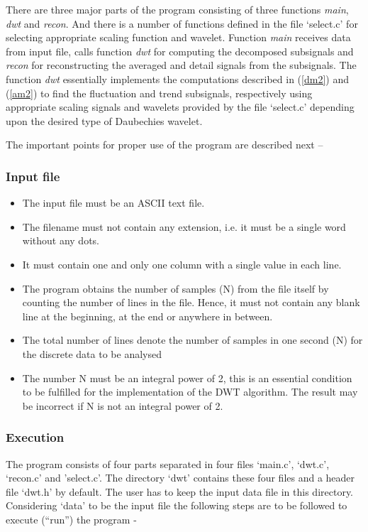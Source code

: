 \documentclass[a4paper,11pt]{report}
\begin{document}
There are three major parts of the program consisting of three functions \emph{main}, \emph{dwt} and \emph{recon}. And there is a number of functions defined in the file `select.c' for selecting appropriate scaling function and wavelet. Function \emph{main} receives data from input file, calls function \emph{dwt} for computing the decomposed subsignals and \emph{recon} for reconstructing the averaged and detail signals from the subsignals. The function \emph{dwt} essentially implements the computations described in (\ref{dm2}) and (\ref{am2}) to find the fluctuation and trend subsignals, respectively using appropriate scaling signals and wavelets provided by the file `select.c' depending upon the desired type of Daubechies wavelet.

The important points for proper use of the program are described next --


\subsubsection{Input file} \label{fftreq}
\begin{itemize}
\item The input file must be an ASCII text file.
\item The filename must not contain any extension, i.e. it must be a single word without any dots.
\item It must contain one and only one column with a single value in each line.
\item The program obtains the number of samples (N) from the file itself by counting the number of lines in the file. Hence, it must not contain any blank line at the beginning, at the end or anywhere in between.
\item The total number of lines denote the number of samples in one second (N) for the discrete data to be analysed
\item The number N must be an integral power of 2, this is an essential condition to be fulfilled for the implementation of the DWT algorithm. The result may be incorrect if N is not an integral power of 2.  
\end{itemize}

\subsubsection{Execution}

The program consists of four parts separated in four files `main.c', `dwt.c', `recon.c' and 'select.c'. The directory `dwt' contains these four files and a header file `dwt.h' by default. The user has to keep the input data file in this directory. Considering `data' to be the input file the following steps are to be followed to execute (``run'') the program - 
	
\end{document}
